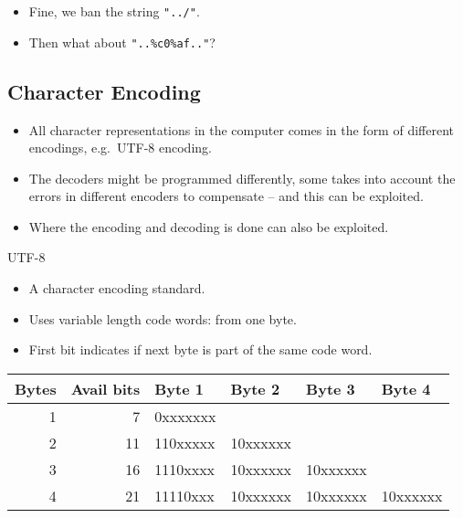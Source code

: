 \begin{frame}
  \begin{itemize}
    \item Fine, we ban the string \texttt{"../"}.

    \item Then what about \texttt{"..\%c0\%af.."}?

  \end{itemize}
\end{frame}

\subsection{Character Encoding}

\begin{frame}
  \begin{itemize}
    \item All character representations in the computer comes in the form of 
      different encodings, e.g.\ UTF-8 encoding.

    \item The decoders might be programmed differently, some takes into account 
      the errors in different encoders to compensate -- and this can be 
      exploited.

    \item Where the encoding and decoding is done can also be exploited.

  \end{itemize}
\end{frame}

\begin{frame}
  \begin{block}{UTF-8}
    \begin{itemize}
      \item A character encoding standard.
      \item Uses variable length code words: from one byte.
      \item First bit indicates if next byte is part of the same code word.
    \end{itemize}
  \end{block}

  \begin{table}
    \begin{tabular}{rrllll}
      \textbf{Bytes} & \textbf{Avail bits} & \textbf{Byte 1}
                                           & \textbf{Byte 2}
                                           & \textbf{Byte 3}
                                           & \textbf{Byte 4} \\
                                           \toprule
      1 & 7  & 0xxxxxxx &          &          & \\
      2 & 11 & 110xxxxx & 10xxxxxx &          & \\
      3 & 16 & 1110xxxx & 10xxxxxx & 10xxxxxx & \\
      4 & 21 & 11110xxx & 10xxxxxx & 10xxxxxx & 10xxxxxx \\
      \bottomrule
    \end{tabular}
  \end{table}
\end{frame}

